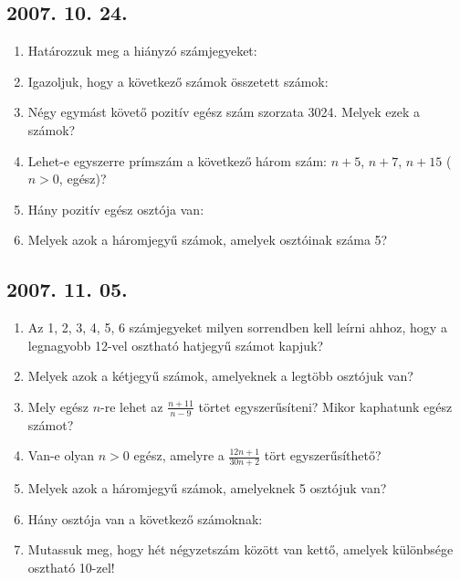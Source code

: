 \subsection*{2007. 10. 24.}
\begin{enumerate}
\item Határozzuk meg a hiányzó számjegyeket:
\item Igazoljuk, hogy a következő számok összetett számok:
\item Négy egymást követő pozitív egész szám szorzata 3024. Melyek ezek a számok?
\item Lehet-e egyszerre prímszám a következő három szám: $n+5$, $n+7$, $n+15$ ($n>0$, egész)?
\item Hány pozitív egész osztója van:
\item Melyek azok a háromjegyű számok, amelyek osztóinak száma 5?
\end{enumerate}


\subsection*{2007. 11. 05.}
\begin{enumerate}
\item Az 1, 2, 3, 4, 5, 6 számjegyeket milyen sorrendben kell leírni ahhoz, hogy a legnagyobb 12-vel osztható hatjegyű számot kapjuk?
\item Melyek azok a kétjegyű számok, amelyeknek a legtöbb osztójuk van?
\item Mely egész $n$-re lehet az $\displaystyle{\frac{n+11}{n-9}}$ törtet egyszerűsíteni? Mikor kaphatunk egész számot? 
\item Van-e olyan $n>0$ egész, amelyre a $\displaystyle{\frac{12n+1}{30n+2}}$ tört egyszerűsíthető?
\item Melyek azok a háromjegyű számok, amelyeknek 5 osztójuk van?
\item Hány osztója van a következő számoknak:
\item Mutassuk meg, hogy hét négyzetszám között van kettő, amelyek különbsége osztható 10-zel!
\end{enumerate}


